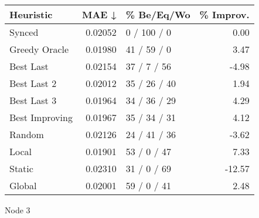 \begin{tabular}{lrlr}
\toprule
\textbf{Heuristic} & \textbf{MAE ↓} & \textbf{\% Be/Eq/Wo} & \textbf{\% Improv.} \\
\midrule
            Synced &        0.02052 &          0 / 100 / 0 &                0.00 \\
     Greedy Oracle &        0.01980 &          41 / 59 / 0 &                3.47 \\
         Best Last &        0.02154 &          37 / 7 / 56 &               -4.98 \\
       Best Last 2 &        0.02012 &         35 / 26 / 40 &                1.94 \\
       Best Last 3 &        0.01964 &         34 / 36 / 29 &                4.29 \\
    Best Improving &        0.01967 &         35 / 34 / 31 &                4.12 \\
            Random &        0.02126 &         24 / 41 / 36 &               -3.62 \\
             Local &        0.01901 &          53 / 0 / 47 &                7.33 \\
            Static &        0.02310 &          31 / 0 / 69 &              -12.57 \\
            Global &        0.02001 &          59 / 0 / 41 &                2.48 \\
\bottomrule
\end{tabular}
\caption{Node 3}
\label{tab:non_lr01_le2_bs2_3}
